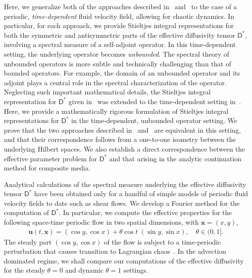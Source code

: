 \documentclass[leqno,onefignum,onetabnum]{siamltex1213}
\newcommand{\Dm}{\mathsf{D}}
\newcommand{\vecx}{\boldsymbol{x}}
\newcommand{\vecu}{\boldsymbol{u}}
\begin{document}
Here, we generalize both of the approaches described
in~\cite{Avellaneda:PRL-753,Avellaneda:CMP-339}
and~\cite{Pavliotis:PHD_Thesis} to the case of a periodic,
\emph{time-dependent} fluid velocity field, allowing for chaotic
dynamics. In particular, for each approach, we provide Stieltjes
integral representations for both the symmetric and antisymmetric
parts of the effective diffusivity tensor $\Dm^*$, involving a
spectral measure of a self-adjoint operator. In this time-dependent
setting, the underlying operator becomes \emph{unbounded}. The
spectral theory of unbounded operators is more subtle and technically
challenging than that of bounded operators. For example, the domain of
an unbounded operator and its adjoint plays a central role in the
spectral characterization of the operator. Neglecting such important
mathematical details, the Stieltjes integral representation for
$\Dm^*$ given in~\cite{Avellaneda:PRL-753,Avellaneda:CMP-339} was
extended to the time-dependent setting
in~\cite{Avellaneda:PRE:3249}. Here, we provide a mathematically
rigorous formulation of Stieltjes integral representations for $\Dm^*$
in the time-dependent, unbounded operator setting. We prove that the
two approaches described
in~\cite{Avellaneda:PRL-753,Avellaneda:CMP-339}
and~\cite{Pavliotis:PHD_Thesis} are equivalent in this setting, and
that their correspondence follows from a one-to-one isometry between
the underlying Hilbert spaces. We also establish a direct
correspondence between the effective parameter problem for $\Dm^*$ and
that arising in the analytic continuation method for composite
media.






Analytical calculations of the spectral measure underlying the
effective diffusivity tensor $\Dm^*$ have been obtained
only for a handful of simple models of periodic fluid velocity
fields to date such as shear flows. We develop a 
Fourier method for the computation of $\Dm^*$. In particular, we 
compute the effective properties for the following space-time periodic
flow in two spatial dimensions, with $\vecx=(x,y)$,
%
\begin{align}\label{eq:tdcell}
\vecu (t,\vecx)=(\cos{y},\cos{x}) + \theta\cos{t}\;(\sin{y},\sin{x}),
\quad
\theta \in (0,1].
\end{align}
%
The steady part $(\cos{y}, \cos{x})$ of the flow is subject to a
time-periodic perturbation that causes transition to Lagrangian
chaos~\cite{Biferale:PF:2725,ZCX_2015}. In the advection dominated
regime, we shall compare our computations of the effective diffusivity
for the steady $\theta=0$ and dynamic $\theta=1$ settings.  
\end{document}
